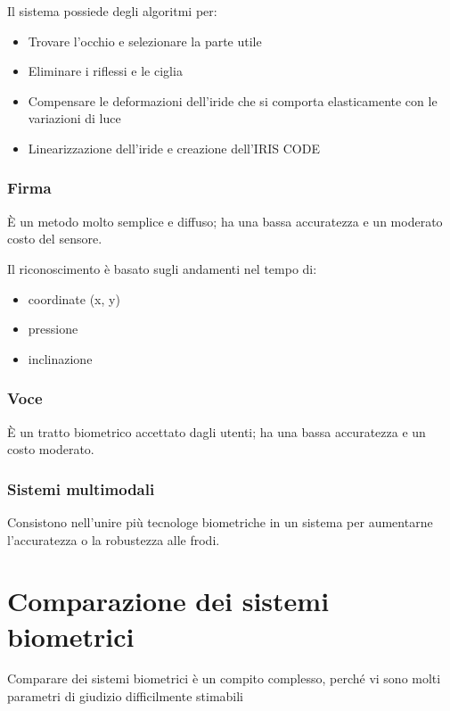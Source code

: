 \noindent Il sistema possiede degli algoritmi per:
\begin{itemize}
    \item Trovare l'occhio e selezionare la parte utile
    \item Eliminare i riflessi e le ciglia
    \item Compensare le deformazioni dell'iride che si comporta elasticamente con le variazioni di luce
    \item Linearizzazione dell'iride e creazione dell'IRIS CODE
\end{itemize}

\subsubsection{Firma}

È un metodo molto semplice e diffuso; ha una bassa accuratezza e un moderato costo del sensore.

\noindent Il riconoscimento è basato sugli andamenti nel tempo di:
\begin{itemize}
    \item coordinate (x, y)
    \item pressione
    \item inclinazione
\end{itemize}

\subsubsection{Voce}

È un tratto biometrico accettato dagli utenti; ha una bassa accuratezza e un costo moderato.

\subsubsection{Sistemi multimodali}

Consistono nell'unire più tecnologe biometriche in un sistema per aumentarne l'accuratezza o la robustezza alle frodi.

\newpage

\section{Comparazione dei sistemi biometrici}

Comparare dei sistemi biometrici è un compito complesso, perché vi sono molti parametri di giudizio difficilmente stimabili

